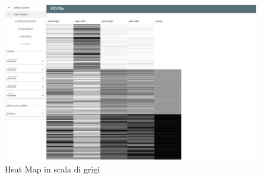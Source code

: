 \documentclass[../manuale_utente.tex]{subfiles}
\begin{document}
\begin{figure}[H]
	\centering
	\includegraphics[width=18cm]{src/img/hm/heat_map_base_gray.jpg}
	\caption{Heat Map in scala di grigi}
\end{figure}
\end{document}

